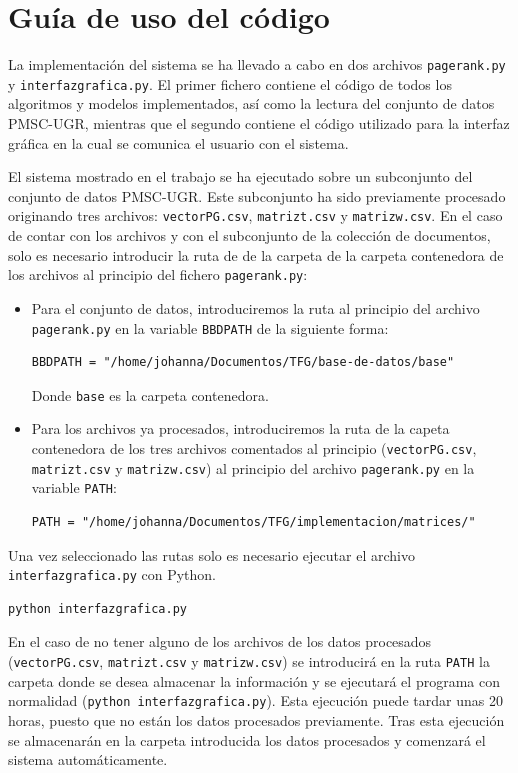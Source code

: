 \documentclass[size=a4, parskip=half, titlepage=false, toc=flat, toc=bib, 12pt, twoside]{scrartcl}
\theoremstyle{theorem-style}
\theoremstyle{definition-style}
\theoremstyle{remark-style}
\theoremstyle{example-style}
\theoremstyle{definition-style}
\theoremstyle{remark-style}
\begin{document}
\appendix
\section{Guía de uso del código}
La implementación del sistema se ha llevado a cabo en dos archivos \verb|pagerank.py| y \verb|interfazgrafica.py|. El primer fichero contiene el código de todos los algoritmos y modelos implementados, así como la lectura del conjunto de datos PMSC-UGR, mientras que el segundo contiene el código utilizado para la interfaz gráfica en la cual se comunica el usuario con el sistema.

El sistema mostrado en el trabajo se ha ejecutado sobre un subconjunto del conjunto de datos PMSC-UGR. Este subconjunto ha sido previamente procesado originando tres archivos: \verb|vectorPG.csv|, \verb|matrizt.csv| y \verb|matrizw.csv|. En el caso de contar con los archivos y con el subconjunto de la colección de documentos, solo es necesario introducir la ruta de de la carpeta de la carpeta contenedora de los archivos al principio del fichero \verb|pagerank.py|:
\begin{itemize}
\item Para el conjunto de datos, introduciremos la ruta al principio del archivo \verb|pagerank.py| en la variable \verb|BBDPATH| de la siguiente forma:
\begin{verbatim}
BBDPATH = "/home/johanna/Documentos/TFG/base-de-datos/base"
\end{verbatim}
Donde \verb|base| es la carpeta contenedora.
\item Para los archivos ya procesados, introduciremos la ruta de la capeta contenedora de los tres archivos comentados al principio (\verb|vectorPG.csv|, \verb|matrizt.csv| y \verb|matrizw.csv|) al principio del archivo \verb|pagerank.py| en la variable \verb|PATH|:
\begin{verbatim}
PATH = "/home/johanna/Documentos/TFG/implementacion/matrices/"
\end{verbatim}
\end{itemize}
Una vez seleccionado las rutas solo es necesario ejecutar el archivo \verb|interfazgrafica.py| con Python.
\begin{verbatim}
python interfazgrafica.py
\end{verbatim}

En el caso de no tener alguno de los archivos de los datos procesados (\verb|vectorPG.csv|, \verb|matrizt.csv| y \verb|matrizw.csv|) se introducirá en la ruta \verb|PATH| la carpeta donde se desea almacenar la información y se ejecutará el programa con normalidad (\texttt{python interfazgrafica.py}). Esta ejecución puede tardar unas 20 horas, puesto que no están los datos procesados previamente. Tras esta ejecución se almacenarán en la carpeta introducida los datos procesados y comenzará el sistema automáticamente.
\end{document}
